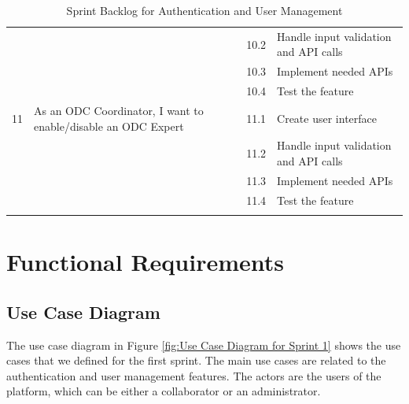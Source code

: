 \begin{longtable}{|p{1cm}|p{7cm}|p{1cm}|p{7cm}|}
                                    &                                                               & 10.2        & Handle input validation and API calls \\ \cline{3-4}
                                    &                                                               & 10.3        & Implement needed APIs                 \\ \cline{3-4}
                                    &                                                               & 10.4        & Test the feature                      \\ \hline
    11                              & As an ODC Coordinator, I want to enable/disable an ODC Expert & 11.1        & Create user interface                 \\ \cline{3-4}
                                    &                                                               & 11.2        & Handle input validation and API calls \\ \cline{3-4}
                                    &                                                               & 11.3        & Implement needed APIs                 \\ \cline{3-4}
                                    &                                                               & 11.4        & Test the feature                      \\ \hline
    \caption{Sprint Backlog for Authentication and User Management}
    \label{tab:sprint_backlog_auth_user_mgmt}
\end{longtable}


\section{Functional Requirements}
\subsection{Use Case Diagram}
The use case diagram in Figure \ref{fig:Use Case Diagram for Sprint 1} shows the use cases that we defined for the first sprint.
The main use cases are related to the authentication and user management features. The actors are the users of the platform,
which can be either a collaborator or an administrator.

